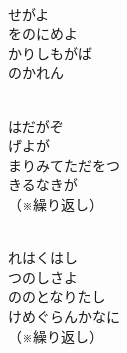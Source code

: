\documentclass[10pt,b5j]{tarticle} %
\begin{document}
\vspace{1.5em} %
\newcommand{\linespace}{0.5em} %
\newcommand{\blocksize}{0.33\hsize} %
\newcommand{\itemmargin}{3em} %
\begin{enumerate} %
    \setlength{\itemindent}{\itemmargin} %
    \begin{minipage}[c]{\blocksize}
    
        \vspace{\linespace}
        \item~\\
        せがよ\\
        をのにめよ\\
        かりしもがば\\
        のかれん\\
        
    \end{minipage}
    \begin{minipage}[c]{\blocksize}
        
        \vspace{\linespace}
        \item~\\
        はだがぞ\\
        げよが\\
        まりみてただをつ\\
        きるなきが\\
        （※繰り返し）
        
    \end{minipage}
    \begin{minipage}[c]{\blocksize}
        
        \vspace{\linespace}
        \item~\\
        れはくはし\\
        つのしさよ\\
        ののとなりたし\\
        けめぐらんかなに\\
        （※繰り返し）
    
    \end{minipage}
\end{enumerate} %
\end{document}
